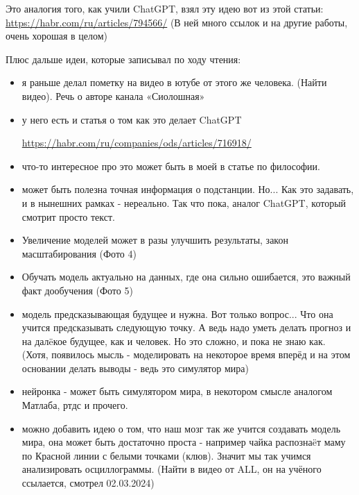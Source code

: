 Это аналогия того, как учили ChatGPT, взял эту идею вот из этой статьи: \url{https://habr.com/ru/articles/794566/}  (В ней много ссылок и на другие работы, очень хорошая в целом)\par\vspace{0.3cm}

Плюс дальше идеи, которые записывал по ходу чтения:\par\vspace{0.3cm}

\begin{itemize}
\item я раньше делал пометку на видео в ютубе от этого же человека. (Найти видео). Речь о авторе канала «Сиолошная»
\item у него есть и статья о том как это делает ChatGPT
\par\url{https://habr.com/ru/companies/ods/articles/716918/}\par\vspace{0.2cm}
\item что-то интересное про это может быть в моей в статье по философии.
\item может быть полезна точная информация о подстанции. Но... Как это задавать, и в нынешних рамках - нереально. Так что пока, аналог ChatGPT, который смотрит просто текст.
\item Увеличение моделей может в разы улучшить результаты, закон масштабирования (Фото 4)
\item Обучать модель актуально на данных, где она сильно ошибается, это важный факт дообучения (Фото 5)
\item модель предсказывающая будущее и нужна. Вот только вопрос... Что она учится предсказывать следующую точку. А ведь надо уметь делать прогноз и на далëкое будущее, как и человек. Но это сложно, и пока не знаю как. (Хотя, появилось мысль - моделировать на некоторое время вперёд и на этом основании делать выводы - ведь это симулятор мира)
\item нейронка - может быть симулятором мира, в некотором смысле аналогом Матлаба, ртдс и прочего.
\item можно добавить идею о том, что наш мозг так же учится создавать модель мира, она может быть достаточно проста - например чайка распознаëт маму по Красной линии с белыми точками (клюв). Значит мы так учимся анализировать осциллограммы. (Найти в видео от ALL, он на учёного ссылается, смотрел 02.03.2024)
\end{itemize}

\par\vspace{0.2cm}
